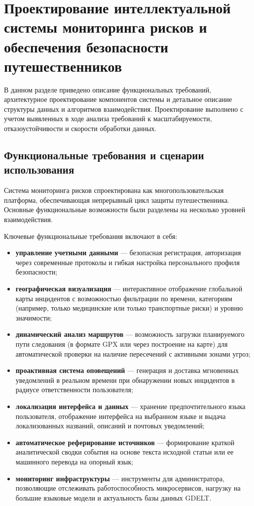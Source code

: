 \section{Проектирование интеллектуальной системы мониторинга рисков и обеспечения безопасности путешественников}
\label{sec:designing}

В данном разделе приведено описание функциональных требований, архитектурное проектирование компонентов системы и детальное описание структуры данных и алгоритмов взаимодействия. Проектирование выполнено с учетом выявленных в ходе анализа требований к масштабируемости, отказоустойчивости и скорости обработки данных.

\subsection{Функциональные требования и сценарии использования}

Система мониторинга рисков спроектирована как многопользовательская платформа, обеспечивающая непрерывный цикл защиты путешественника. Основные функциональные возможности были разделены на несколько уровней взаимодействия.

Ключевые функциональные требования включают в себя:
\begin{itemize}
    \item \textbf{управление учетными данными} --- безопасная регистрация, авторизация через современные протоколы и гибкая настройка персонального профиля безопасности;
    \item \textbf{географическая визуализация} --- интерактивное отображение глобальной карты инцидентов с возможностью фильтрации по времени, категориям (например, только медицинские или только транспортные риски) и уровню значимости;
    \item \textbf{динамический анализ маршрутов} --- возможность загрузки планируемого пути следования (в формате GPX или через построение на карте) для автоматической проверки на наличие пересечений с активными зонами угроз;
    \item \textbf{проактивная система оповещений} --- генерация и доставка мгновенных уведомлений в реальном времени при обнаружении новых инцидентов в радиусе ответственности пользователя;
    \item \textbf{локализация интерфейса и данных} --- хранение предпочтительного языка пользователя, отображение интерфейса на выбранном языке и выдача локализованных названий, описаний и почтовых уведомлений;
    \item \textbf{автоматическое реферирование источников} --- формирование краткой аналитической сводки события на основе текста исходной статьи или ее машинного перевода на опорный язык;
    \item \textbf{мониторинг инфраструктуры} --- инструменты для администратора, позволяющие отслеживать работоспособность микросервисов, нагрузку на большие языковые модели и актуальность базы данных GDELT.
\end{itemize}

